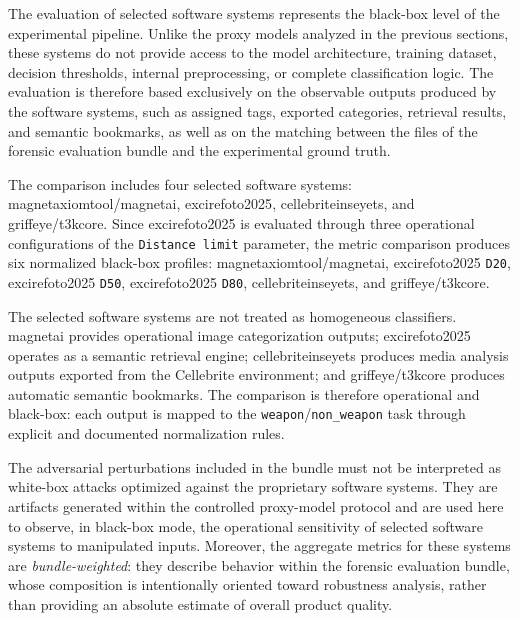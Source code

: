 \label{sec:results-commercial}

The evaluation of selected software systems represents the black-box level of
the experimental pipeline. Unlike the proxy models analyzed in the previous
sections, these systems do not provide access to the model architecture,
training dataset, decision thresholds, internal preprocessing, or complete
classification logic. The evaluation is therefore based exclusively on the
observable outputs produced by the software systems, such as assigned tags,
exported categories, retrieval results, and semantic bookmarks, as well as on
the matching between the files of the forensic evaluation bundle and the
experimental ground truth.

The comparison includes four selected software systems:
\gls{magnetaxiomtool}/\gls{magnetai}, \gls{excirefoto2025},
\gls{cellebriteinseyets}, and \gls{griffeye}/\gls{t3kcore}. Since
\gls{excirefoto2025} is evaluated through three operational configurations of
the \texttt{Distance limit} parameter, the metric comparison produces six
normalized black-box profiles: \gls{magnetaxiomtool}/\gls{magnetai},
\gls{excirefoto2025} \texttt{D20}, \gls{excirefoto2025} \texttt{D50},
\gls{excirefoto2025} \texttt{D80}, \gls{cellebriteinseyets}, and
\gls{griffeye}/\gls{t3kcore}.

The selected software systems are not treated as homogeneous classifiers.
\gls{magnetai} provides operational image categorization outputs;
\gls{excirefoto2025} operates as a semantic retrieval engine;
\gls{cellebriteinseyets} produces media analysis outputs exported from the
Cellebrite environment; and \gls{griffeye}/\gls{t3kcore} produces automatic
semantic bookmarks. The comparison is therefore operational and black-box: each
output is mapped to the \texttt{weapon}/\texttt{non\_weapon} task through
explicit and documented normalization rules.

The adversarial perturbations included in the bundle must not be interpreted as
white-box attacks optimized against the proprietary software systems. They are
artifacts generated within the controlled proxy-model protocol and are used
here to observe, in black-box mode, the operational sensitivity of selected
software systems to manipulated inputs. Moreover, the aggregate metrics for
these systems are \emph{bundle-weighted}: they describe behavior within the
forensic evaluation bundle, whose composition is intentionally oriented toward
robustness analysis, rather than providing an absolute estimate of overall
product quality.

